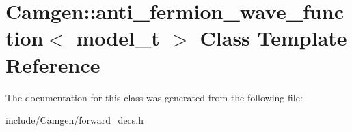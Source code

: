 \hypertarget{a00010}{}\section{Camgen\+:\+:anti\+\_\+fermion\+\_\+wave\+\_\+function$<$ model\+\_\+t $>$ Class Template Reference}
\label{a00010}


The documentation for this class was generated from the following file\+:\begin{DoxyCompactItemize}
\item 
include/\+Camgen/forward\+\_\+decs.\+h\end{DoxyCompactItemize}

